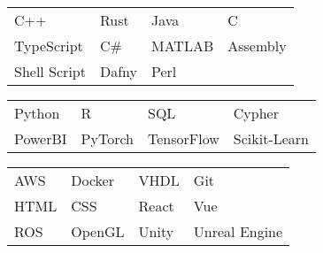 \documentclass[paper=a4,fontsize=10pt]{resume}
\begin{document}
{	
		\begin{tabular}{llll}
			C++ & Rust & Java & C \\
			TypeScript & C\# & MATLAB & Assembly \\
			Shell Script & Dafny & Perl
		\end{tabular}

		\medskip\normalsize

		\begin{tabular}{llll}
			Python & R & SQL & Cypher \\
			PowerBI & PyTorch & TensorFlow & Scikit-Learn
		\end{tabular}

		\medskip\normalsize

		\begin{tabular}{llll}
			AWS & Docker & VHDL & Git \\
			HTML & CSS & React & Vue \\
			ROS & OpenGL & Unity & Unreal Engine \\
		\end{tabular}
}
\end{document}
